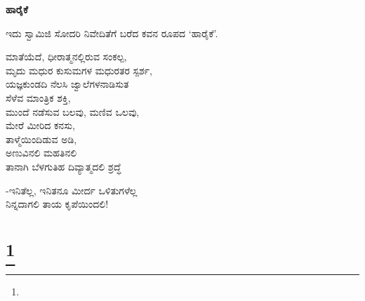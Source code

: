 \selectkan

\begin{center}
\textbf{ಹಾರೈಕೆ}
\end{center}

\begin{center}
ಇದು ಸ್ವಾಮಿಜಿ ಸೋದರಿ ನಿವೇದಿತೆಗೆ ಬರೆದ ಕವನ ರೂಪದ ‘ಹಾರೈಕೆ’.
\end{center}

\begin{myquote}
ಮಾತೆಯೆದೆ, ಧೀರಾತ್ಮನಲ್ಲಿರುವ ಸಂಕಲ್ಪ,\\ಮೃದು ಮಧುರ ಕುಸುಮಗಳ ಮಧುರತರ ಸ್ಪರ್ಶ,\\ಯಜ್ಞಕುಂಡದಿ ನೆಲಸಿ ಜ್ವಾಲೆಗಳನಾಡಿಸುತ\\ಸೆಳೆವ ಮಾಂತ್ರಿಕ ಶಕ್ತಿ,\\ಮುಂದೆ ನಡೆಸುವ ಬಲವು, ಮಣಿವ ಒಲವು,\\ಮೇರೆ ಮೀರಿದ ಕನಸು,\\ತಾಳ್ಮೆಯಿಂದಿಡುವ ಅಡಿ,\\ಅಣುವಿನಲಿ ಮಹತಿನಲಿ\\ತಾನಾಗಿ ಬೆಳಗುತಿಹ ದಿವ್ಯಾತ್ಮದಲಿ ಶ್ರದ್ಧೆ
\end{myquote}

\begin{myquote}
-ಇನಿತೆಲ್ಲ, ಇನಿತನೂ ಮೀರ್ದ ಒಳಿತುಗಳೆಲ್ಲ\\ನಿನ್ನದಾಗಲಿ ತಾಯ ಕೃಪೆಯಿಂದಲಿ!
\end{myquote}

\selecteng

\chapter[REQUIESCAT IN PACE]{\protect\footnote{}}

\begin{myquote}
\end{myquote}

\begin{myquote}
\end{myquote}

